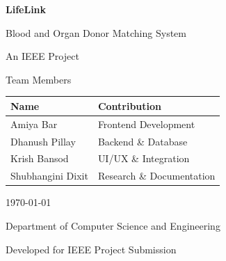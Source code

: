 \documentclass[12pt,a4paper]{article}
\begin{document}
\begin{titlepage}
    \centering
    \vspace*{2cm}


    \vspace{1cm}
    {\Huge\bfseries\textcolor{dark}{LifeLink} \par}
    \vspace{0.3cm}
    {\Large\textcolor{primary}{Blood and Organ Donor Matching System} \par}
    \vspace{0.5cm}
    {\large\textcolor{midgray}{An IEEE Project} \par}

    \vspace{3cm}

    {\large\textcolor{dark}{Team Members} \par}
    \vspace{0.5cm}
    \renewcommand{\arraystretch}{1.6}
    \begin{tabular}{|>{\centering\arraybackslash}m{}|>{\centering\arraybackslash}m{}|}
        \hline
        \textbf{Name} & \textbf{Contribution} \\
        \hline
        Amiya Bar & Frontend Development \\
        \hline
        Dhanush Pillay & Backend \& Database \\
        \hline
        Krish Bansod & UI/UX \& Integration \\
        \hline
        Shubhangini Dixit & Research \& Documentation \\
        \hline
    \end{tabular}

    \vspace{3cm}

    {\large\textcolor{dark}{\today} \par}
    \vfill
    {\small\textcolor{midgray}{Department of Computer Science and Engineering} \par}
    {\small\textcolor{midgray}{Developed for IEEE Project Submission} \par}
\end{titlepage}
\end{document}
